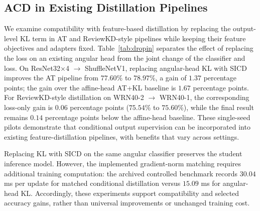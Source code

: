 \subsection{ACD in Existing Distillation Pipelines}

We examine compatibility with feature-based distillation by replacing
the output-level KL term in AT and ReviewKD-style pipelines while
keeping their feature objectives and adapters fixed.
Table~\ref{tab:dropin} separates the effect of replacing the loss on an
existing angular head from the joint change of the classifier and loss.
On ResNet32$\times$4 $\to$ ShuffleNetV1, replacing angular-head KL
with SICD improves the AT pipeline from $77.60\%$ to $78.97\%$,
a gain of $1.37$ percentage points; the gain over the affine-head
AT+KL baseline is $1.67$ percentage points.
For ReviewKD-style distillation on WRN40-2 $\to$ WRN40-1,
the corresponding loss-only gain is $0.06$ percentage points
($75.54\%$ to $75.60\%$), while the final result remains
$0.14$ percentage points below the affine-head baseline.
These single-seed pilots demonstrate that conditional output supervision
can be incorporated into existing feature-distillation pipelines,
with benefits that vary across settings.

Replacing KL with SICD on the same angular classifier preserves the
student inference model. However, the implemented gradient-norm
matching requires additional training computation: the archived
controlled benchmark records $30.04$ ms per update for matched
conditional distillation versus $15.09$ ms for angular-head KL.
Accordingly, these experiments support compatibility and selected
accuracy gains, rather than universal improvements or unchanged
training cost.
